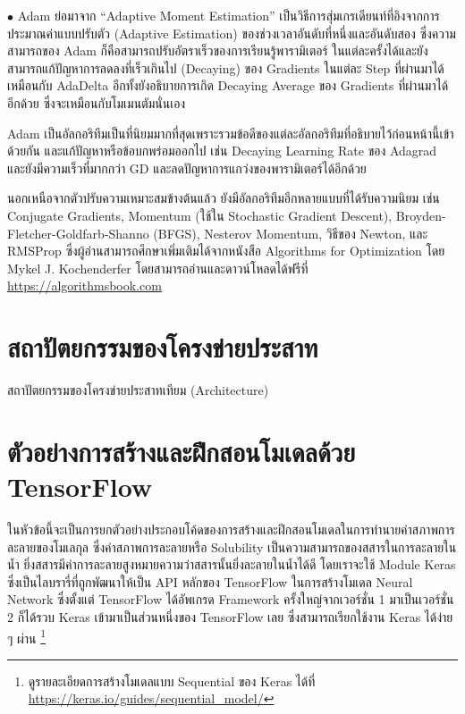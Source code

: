 \noindent $\bullet$ Adam ย่อมาจาก \enquote{Adaptive Moment Estimation} เป็นวิธีการสุ่มเกรเดียนท์ที่อิงจากการประมาณค่าแบบปรับตัว 
(Adaptive Estimation) ของช่วงเวลาอันดับที่หนึ่งและอันดับสอง ซึ่งความสามารถของ Adam ก็คือสามารถปรับอัตราเร็วของการเรียนรู้พารามิเตอร์%
ในแต่ละครั้งได้และยังสามารถแก้ปัญหาการลดลงที่เร็วเกินไป (Decaying) ของ Gradients ในแต่ละ Step ที่ผ่านมาได้เหมือนกับ AdaDelta 
อีกทั้งยังอธิบายการเกิด Decaying Average ของ Gradients ที่ผ่านมาได้อีกด้วย ซึ่งจะเหมือนกับโมเมนตัมนั่นเอง

Adam เป็นอัลกอริทึมเป็นที่นิยมมากที่สุดเพราะรวมข้อดีของแต่ละอัลกอริทึมที่อธิบายไว้ก่อนหน้านี้เข้าด้วยกัน และแก้ปัญหาหรือข้อบกพร่อมออกไป 
เช่น Decaying Learning Rate ของ Adagrad และยังมีความเร็วที่มากกว่า GD และลดปัญหาการแกว่งของพารามิเตอร์ได้อีกด้วย

นอกเหนือจากตัวปรับความเหมาะสมข้างต้นแล้ว ยังมีอัลกอริทึมอีกหลายแบบที่ได้รับความนิยม เช่น Conjugate Gradients, Momentum (ใช้ใน
Stochastic Gradient Descent), Broyden-Fletcher-Goldfarb-Shanno (BFGS), Nesterov Momentum, วิธีของ Newton, และ
RMSProp ซึ่งผู้อ่านสามารถศึกษาเพิ่มเติมได้จากหนังสือ Algorithms for Optimization\autocite{kochenderfer2019} โดย Mykel J. 
Kochenderfer โดยสามารถอ่านและดาวน์โหลดได้ฟรีที่ \url{https://algorithmsbook.com}

\section{สถาปัตยกรรมของโครงข่ายประสาท}
\label{sec:arch_nn}

สถาปัตยกรรมของโครงข่ายประสาทเทียม (Architecture)

\section{ตัวอย่างการสร้างและฝึกสอนโมเดลด้วย TensorFlow}
\label{sec:train_tf}

ในหัวข้อนี้จะเป็นการยกตัวอย่างประกอบโค้ดของการสร้างและฝึกสอนโมเดลในการทำนายค่าสภาพการละลายของโมเลกุล ซึ่งค่าสภาพการละลายหรือ
Solubility เป็นความสามารถของสสารในการละลายในน้ำ ยิ่งสสารมีค่าการละลายสูงหมายความว่าสสารนั้นยิ่งละลายในน้ำได้ดี โดยเราจะใช้ Module 
Keras ซึ่งเป็นไลบรารี่ที่ถูกพัฒนาให้เป็น API หลักของ TensorFlow ในการสร้างโมเดล Neural Network ซึ่งตั้งแต่ TensorFlow ได้อัพเกรด 
Framework ครั้งใหญ่จากเวอร์ชั่น 1 มาเป็นเวอร์ชั่น 2 ก็ได้รวบ Keras เข้ามาเป็นส่วนหนึ่งของ TensorFlow เลย ซึ่งสามารถเรียกใช้งาน Keras 
ได้ง่าย ๆ ผ่าน \footnote{ดูรายละเอียดการสร้างโมเดลแบบ Sequential ของ Keras ได้ที่ 
\url{https://keras.io/guides/sequential_model/}}

